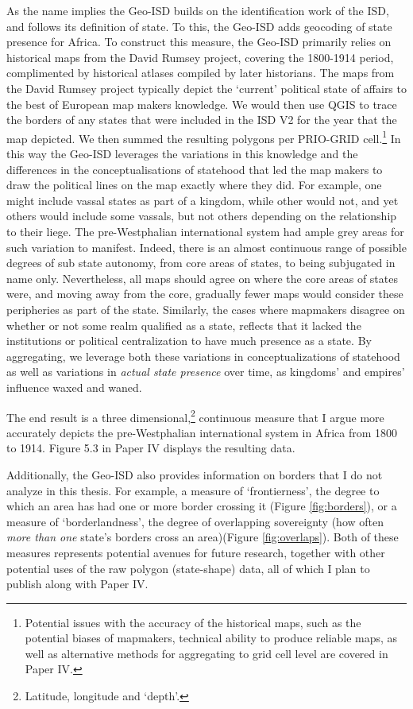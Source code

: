 As the name implies the Geo-ISD builds on the identification work of the ISD,
and follows its definition of state. To this, the Geo-ISD adds geocoding of
state presence for Africa. To construct this measure, the Geo-ISD primarily
relies on historical maps from the David Rumsey project, covering the 1800-1914
period, complimented by historical atlases compiled by later historians. The
maps from the David Rumsey project typically depict the `current' political
state of affairs to the best of European map makers knowledge. We would then use
QGIS to trace the borders of any states that were included in the ISD V2 for the
year that the map depicted. We then summed the resulting polygons per PRIO-GRID
cell.\footnote{Potential issues with the accuracy of the historical maps, such
as the potential biases of mapmakers, technical ability to produce reliable
maps, as well as alternative methods for aggregating to grid cell level are
covered in Paper IV.} In this way the Geo-ISD leverages the variations in this
knowledge and the differences in the conceptualisations of statehood that led
the map makers to draw the political lines on the map exactly where they did.
For example, one might include vassal states as part of a kingdom, while other
would not, and yet others would include some vassals, but not others depending
on the relationship to their liege. The pre-Westphalian international system had
ample grey areas for such variation to manifest. Indeed, there is an almost
continuous range of possible degrees of sub state autonomy, from core areas of
states, to being subjugated in name only. Nevertheless, all maps should agree on
where the core areas of states were, and moving away from the core, gradually
fewer maps would consider these peripheries as part of the state. Similarly, the
cases where mapmakers disagree on whether or not some realm qualified as a
state, reflects that it lacked the institutions or political centralization to
have much presence as a state. By aggregating, we leverage both these variations
in conceptualizations of statehood as well as variations in \textit{actual state
presence} over time, as kingdoms' and empires' influence waxed and waned.

The end result is a three dimensional,\footnote{Latitude, longitude and `depth'.}
continuous measure that I argue more accurately depicts the pre-Westphalian
international system in Africa from 1800 to 1914. Figure 5.3 in Paper IV
displays the resulting data. 

Additionally, the Geo-ISD also provides information on borders that I do not analyze
in this thesis. For example, a measure of `frontierness', the degree to
which an area has had one or more border crossing it (Figure \ref{fig:borders}),
or a measure of `borderlandness', the degree of overlapping sovereignty (how
often \textit{more than one} state's borders cross an area)(Figure
\ref{fig:overlaps}). Both of these measures represents potential avenues for
future research, together with other potential uses of the raw polygon
(state-shape) data, all of which I plan to publish along with Paper IV.

